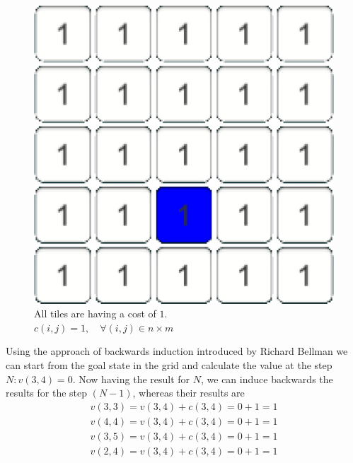 \documentclass[conference]{IEEEtran}
\begin{document}
\begin{figure}[h]
\centering
\begin{minipage}[t]{0.3\linewidth}
\centering
\includegraphics[width=1\textwidth]{images/ValueFunction/original.png}
\end{minipage}
\caption{All tiles are having a cost of
$1$.\\
$c(i,j) = 1, \quad \forall (i,j) \in n \times m$}
\end{figure}
Using the approach of backwards induction introduced by Richard Bellman we can start from the goal state in the grid and calculate the value at the step $N: v(3,4) = 0$.
Now having the result for $N$, we can induce backwards the results for the step $(N-1)$, whereas their results are
\begin{align}
v(3,3) = v(3,4) + c(3,4) = 0 + 1 = 1\\
v(4,4) = v(3,4) + c(3,4) = 0 + 1 = 1\\
v(3,5) = v(3,4) + c(3,4) = 0 + 1 = 1\\
v(2,4) = v(3,4) + c(3,4) = 0 + 1 = 1
\end{align}
\end{document}
